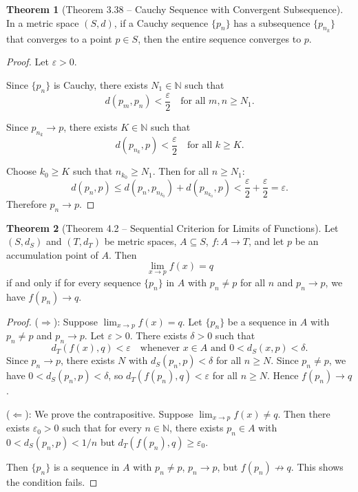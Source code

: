 \documentclass[12pt,a4paper]{article}
\theoremstyle{definition}
\newtheorem{theorem}{Theorem}[section]
\newcommand{\N}{\mathbb{N}}
\newcommand{\eps}{\varepsilon}
\begin{document}
\begin{theorem}[Theorem 3.38 -- Cauchy Sequence with Convergent Subsequence]
In a metric space $(S, d)$, if a Cauchy sequence $\{p_n\}$ has a subsequence $\{p_{n_k}\}$ that converges to a point $p \in S$, then the entire sequence converges to $p$.
\end{theorem}

\begin{proof}
Let $\eps > 0$.

Since $\{p_n\}$ is Cauchy, there exists $N_1 \in \N$ such that
\[
    d(p_m, p_n) < \frac{\eps}{2} \quad \text{for all } m, n \geq N_1.
\]

Since $p_{n_k} \to p$, there exists $K \in \N$ such that
\[
    d(p_{n_k}, p) < \frac{\eps}{2} \quad \text{for all } k \geq K.
\]

Choose $k_0 \geq K$ such that $n_{k_0} \geq N_1$. Then for all $n \geq N_1$:
\[
    d(p_n, p) \leq d(p_n, p_{n_{k_0}}) + d(p_{n_{k_0}}, p) < \frac{\eps}{2} + \frac{\eps}{2} = \eps.
\]
Therefore $p_n \to p$.
\end{proof}

\begin{theorem}[Theorem 4.2 -- Sequential Criterion for Limits of Functions]
Let $(S, d_S)$ and $(T, d_T)$ be metric spaces, $A \subseteq S$, $f: A \to T$, and let $p$ be an accumulation point of $A$. Then
\[
    \lim_{x \to p} f(x) = q
\]
if and only if for every sequence $\{p_n\}$ in $A$ with $p_n \neq p$ for all $n$ and $p_n \to p$, we have $f(p_n) \to q$.
\end{theorem}

\begin{proof}
($\Rightarrow$): Suppose $\lim_{x \to p} f(x) = q$. Let $\{p_n\}$ be a sequence in $A$ with $p_n \neq p$ and $p_n \to p$. Let $\eps > 0$. There exists $\delta > 0$ such that
\[
    d_T(f(x), q) < \eps \quad \text{whenever } x \in A \text{ and } 0 < d_S(x, p) < \delta.
\]
Since $p_n \to p$, there exists $N$ with $d_S(p_n, p) < \delta$ for all $n \geq N$. Since $p_n \neq p$, we have $0 < d_S(p_n, p) < \delta$, so $d_T(f(p_n), q) < \eps$ for all $n \geq N$. Hence $f(p_n) \to q$.

\medskip
($\Leftarrow$): We prove the contrapositive. Suppose $\lim_{x \to p} f(x) \neq q$. Then there exists $\eps_0 > 0$ such that for every $n \in \N$, there exists $p_n \in A$ with $0 < d_S(p_n, p) < 1/n$ but $d_T(f(p_n), q) \geq \eps_0$.

Then $\{p_n\}$ is a sequence in $A$ with $p_n \neq p$, $p_n \to p$, but $f(p_n) \not\to q$. This shows the condition fails.
\end{proof}
\end{document}
